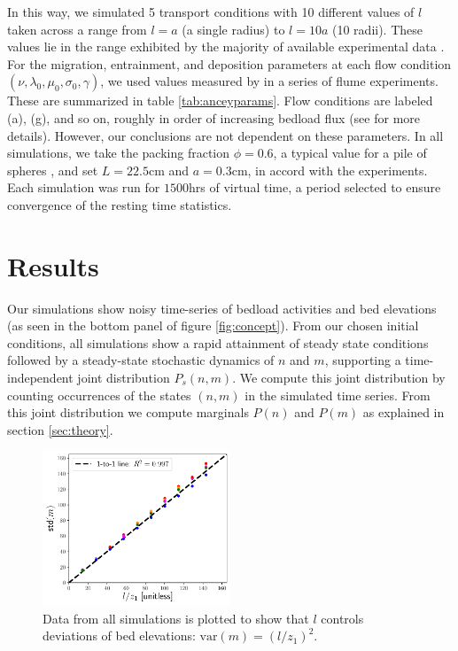 \documentclass[draft]{agujournal2018}
\begin{document}
In this way, we simulated 5 transport conditions with 10 different values of $l$ taken across a range from $l=a$ (a single radius) to $l=10a$ (10 radii).
These values lie in the range exhibited by the majority of available experimental data \citep{Wong2007,Singh2009,Martin2014}.
For the migration, entrainment, and deposition parameters at each flow condition $(\nu, \lambda_0, \mu_0, \sigma_0, \gamma)$, we used values measured by \citet{Ancey2008} in a series of flume experiments.
These are summarized in table \ref{tab:anceyparams}.
Flow conditions are labeled (a), (g), and so on, roughly in order of increasing bedload flux (see \citet{Ancey2008} for more details). 
However, our conclusions are not dependent on these parameters.
In all simulations, we take the packing fraction $\phi = 0.6$, a typical value for a pile of spheres \citep[e.g.][]{Bennett1972}, and set $L = 22.5$cm and $a = 0.3$cm, in accord with the \citet{Ancey2008} experiments.
Each simulation was run for $1500$hrs of virtual time, a period selected to ensure convergence of the resting time statistics.

\section{Results}

Our simulations show noisy time-series of bedload activities and bed elevations (as seen in the bottom panel of figure \ref{fig:concept}).
From our chosen initial conditions, all simulations show a rapid attainment of steady state conditions followed by a steady-state stochastic dynamics of $n$ and $m$, supporting a time-independent joint distribution $P_s(n,m)$. 
We compute this joint distribution by counting occurrences of the states $(n,m)$ in the simulated time series.
From this joint distribution we compute marginals $P(n)$ and $P(m)$ as explained in section \ref{sec:theory}.

\begin{figure}
	\centering
	\includegraphics[width=0.5\textwidth,keepaspectratio]{./figures/variance.pdf}
	\caption{Data from all simulations is plotted to show that $l$ controls deviations of bed elevations: $\text{var}(m) = (l/z_1)^2$. }
	\label{fig:var}
\end{figure}
\end{document}
